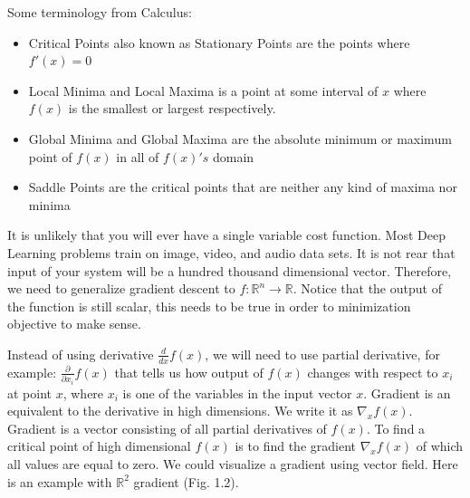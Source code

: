 \documentclass[paper=a4, fontsize=11pt]{scrartcl}
\numberwithin{equation}{section}		%
\numberwithin{figure}{section}			%
\numberwithin{table}{section}			%
\begin{document}
Some terminology from Calculus:
\begin{itemize}
		\item Critical Points also known as Stationary Points are the points where $ f'(x) = 0 $ 
		\item Local Minima and Local Maxima is a point at some interval of $x$ where $f(x)$ is the smallest or largest respectively.
        \item Global Minima and Global Maxima are the absolute minimum or maximum point of $f(x)$ in all of $f(x)'s$ domain
        \item Saddle Points are the critical points that are neither any kind of maxima nor minima
	\end{itemize}
    It is unlikely that you will ever have a single variable cost function. Most Deep Learning problems train on image, video, and audio data sets. It is not rear that input of your system will be a hundred thousand dimensional vector. Therefore, we need to generalize gradient descent to $f: \mathbb{R}^n \rightarrow \mathbb{R} $. Notice that the output of the function is still scalar, this needs to be true in order to minimization objective to make sense. \par
    Instead of using derivative $\frac{d}{dx}f(x)$, we will need to use partial derivative, for example: $\frac{\partial}{\partial x_{i} }f(x)$ that tells us how output of $f(x)$ changes with respect to $x_{i}$ at point $x$, where $x_{i}$ is one of the variables in the input vector $x$. Gradient is an equivalent to the derivative in high dimensions. We write it as $\nabla_{x} f(x)$. Gradient is a vector consisting of all partial derivatives of $f(x)$. To find a critical point of high dimensional $f(x)$ is to find the gradient $\nabla_{x} f(x)$ of which all values are equal to zero. We could visualize a gradient using vector field. Here is an example with $\mathbb{R}^2$ gradient (Fig. 1.2).\par
\end{document}
